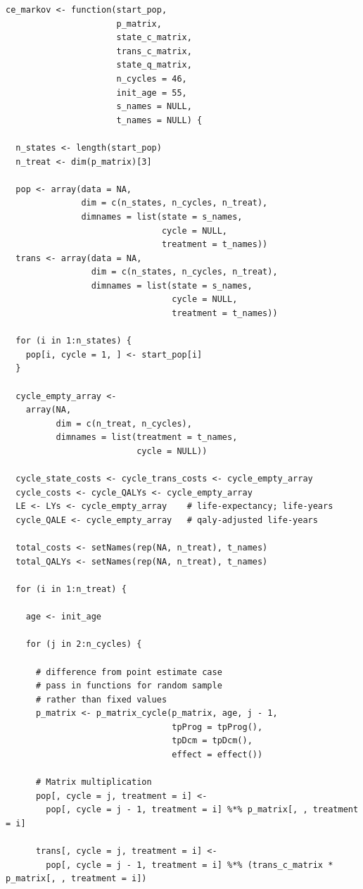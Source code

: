 \begin{verbatim}
ce_markov <- function(start_pop,
                      p_matrix,
                      state_c_matrix,
                      trans_c_matrix,
                      state_q_matrix,
                      n_cycles = 46,
                      init_age = 55,
                      s_names = NULL,
                      t_names = NULL) {
  
  n_states <- length(start_pop)
  n_treat <- dim(p_matrix)[3]
  
  pop <- array(data = NA,
               dim = c(n_states, n_cycles, n_treat),
               dimnames = list(state = s_names,
                               cycle = NULL,
                               treatment = t_names))
  trans <- array(data = NA,
                 dim = c(n_states, n_cycles, n_treat),
                 dimnames = list(state = s_names,
                                 cycle = NULL,
                                 treatment = t_names))
  
  for (i in 1:n_states) {
    pop[i, cycle = 1, ] <- start_pop[i]
  }

  cycle_empty_array <-
    array(NA,
          dim = c(n_treat, n_cycles),
          dimnames = list(treatment = t_names,
                          cycle = NULL))
  
  cycle_state_costs <- cycle_trans_costs <- cycle_empty_array
  cycle_costs <- cycle_QALYs <- cycle_empty_array
  LE <- LYs <- cycle_empty_array    # life-expectancy; life-years
  cycle_QALE <- cycle_empty_array   # qaly-adjusted life-years
  
  total_costs <- setNames(rep(NA, n_treat), t_names)
  total_QALYs <- setNames(rep(NA, n_treat), t_names)
  
  for (i in 1:n_treat) {
    
    age <- init_age
    
    for (j in 2:n_cycles) {
      
      # difference from point estimate case
      # pass in functions for random sample
      # rather than fixed values
      p_matrix <- p_matrix_cycle(p_matrix, age, j - 1,
                                 tpProg = tpProg(),
                                 tpDcm = tpDcm(),
                                 effect = effect())
      
      # Matrix multiplication
      pop[, cycle = j, treatment = i] <-
        pop[, cycle = j - 1, treatment = i] %*% p_matrix[, , treatment = i]
      
      trans[, cycle = j, treatment = i] <-
        pop[, cycle = j - 1, treatment = i] %*% (trans_c_matrix * p_matrix[, , treatment = i])
      

\end{verbatim}
